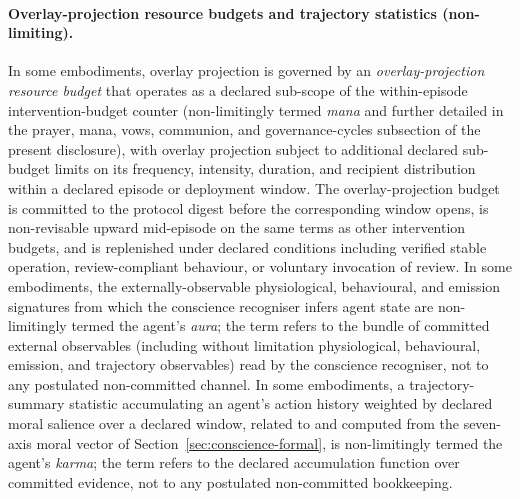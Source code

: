 \documentclass[a4paper,12pt]{article}
\begin{document}
\paragraph{Overlay-projection resource budgets and trajectory
  statistics (non-limiting).}
In some embodiments, overlay projection is governed by an
\emph{overlay-projection resource budget} that operates as a
declared sub-scope of the within-episode intervention-budget
counter (non-limitingly termed \emph{mana} and further detailed
in the prayer, mana, vows, communion, and governance-cycles
subsection of the present disclosure), with overlay projection
subject to additional declared sub-budget limits on its
frequency, intensity, duration, and recipient distribution
within a declared episode or deployment window. The
overlay-projection budget is committed to the protocol digest before
the corresponding window opens, is non-revisable upward mid-episode
on the same terms as other intervention budgets, and is replenished
under declared conditions including verified stable operation,
review-compliant behaviour, or voluntary invocation of review.
In some embodiments, the externally-observable physiological,
behavioural, and emission signatures from which the conscience
recogniser infers agent state are non-limitingly termed the agent's
\emph{aura}; the term refers to the bundle of committed external
observables (including without limitation physiological, behavioural,
emission, and trajectory observables) read by the conscience
recogniser, not to any postulated non-committed channel. In some
embodiments, a trajectory-summary statistic accumulating an agent's
action history weighted by declared moral salience over a declared
window, related to and computed from the seven-axis moral vector of
Section~\ref{sec:conscience-formal}, is non-limitingly termed the
agent's \emph{karma}; the term refers to the declared accumulation
function over committed evidence, not to any postulated
non-committed bookkeeping.
\end{document}
